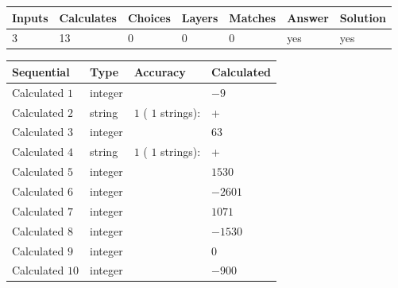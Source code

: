 \documentclass[12pt]{article}
\begin{document}
 
 
\noindent{}
 
 

 
\vspace{0.3in}
   
   
   
   
\noindent\begin{tabular}{|l|l|l|l|l|l|l|}
 \hline
Inputs & Calculates & Choices & Layers & Matches & Answer & Solution \\ \hline
           3  & 
          13  & 
           0
  & 
           0  & 
           0  & 
  yes & 
  yes 
  \\ \hline
 \end{tabular}
   
   
   
   
\noindent{}
   
   
  
  
\noindent\begin{tabular}{|l|l|l|l|}
\hline
 Sequential & Type & Accuracy & Calculated \\ 
\hline
 
 
  Calculated $            1 $ & integer &  & 
  $ -9 $ 
 \\  \hline  
 
 
  Calculated $            2 $ & string & $            1  $ ( $           1  $ strings): 
 & +
 \\  \hline  
 
 
  Calculated $            3 $ & integer &  & 
  $ 63 $ 
 \\  \hline  
 
 
  Calculated $            4 $ & string & $            1  $ ( $           1  $ strings): 
 & +
 \\  \hline  
 
 
  Calculated $            5 $ & integer &  & 
  $ 1530 $ 
 \\  \hline  
 
 
  Calculated $            6 $ & integer &  & 
  $ -2601 $ 
 \\  \hline  
 
 
  Calculated $            7 $ & integer &  & 
  $ 1071 $ 
 \\  \hline  
 
 
  Calculated $            8 $ & integer &  & 
  $ -1530 $ 
 \\  \hline  
 
 
  Calculated $            9 $ & integer &  & 
  $ 0 $ 
 \\  \hline  
 
 
  Calculated $           10 $ & integer &  & 
  $ -900 $ 
 \\  \hline  
 \end{tabular}
   
\end{document}
